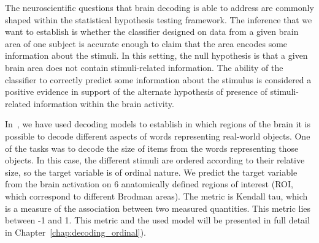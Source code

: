 The neuroscientific questions that brain decoding is able to address are commonly shaped within the statistical hypothesis testing framework. The inference that we want to establish is whether the classifier designed on data from a given brain area of one subject is accurate enough to claim that the area encodes some information about the stimuli. In this setting, the null hypothesis is that a given brain area does not contain stimuli-related information. The ability of the classifier to correctly predict some information about the stimulus is considered a positive evidence in support of the alternate hypothesis of presence of stimuli-related information within the brain activity.








In~\citep{borghesani:hal-00986606}, we have used decoding models to establish in which regions of the brain it is possible to decode different aspects of words representing real-world objects. One of the tasks was to decode the size of items from the words representing those objects. In this case, the different stimuli are ordered according to their relative size, so the target variable is of ordinal nature. We predict the target variable from the brain activation on 6 anatomically defined regions of interest (ROI, which correspond to different Brodman areas). The metric is Kendall tau, which is a measure of the association between two measured quantities. This metric lies between -1 and 1. This metric and the used model will be presented in full detail in Chapter~\ref{chap:decoding_ordinal}).

